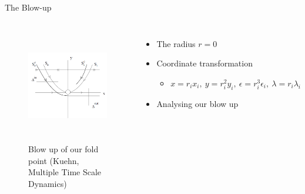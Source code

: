 \documentclass[11pt]{beamer}
\begin{document}
\begin{frame}{The Blow-up}
\begin{columns}
\begin{figure}
    \centering
    \includegraphics[height=5cm, width=5cm]{Blow_up.png}
    \caption{Blow up of our fold point (Kuehn, Multiple Time Scale Dynamics)}
\end{figure}

\begin{itemize}

\item The radius $r=0$
\item Coordinate transformation
\begin{itemize}
    \item $x=r_ix_i, \ y=r_i^2y_i, \ \epsilon=r_i^3\epsilon_i, \ \lambda=r_i\lambda_i$\\
\end{itemize}
\item Analysing our blow up
\end{itemize}
\end{columns}
\end{frame}
\end{document}
